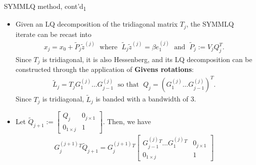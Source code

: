 \documentclass[t,usepdftitle=false]{beamer}
\begin{document}
\begin{frame}{SYMMLQ method, cont'd\textsubscript{1}}
\begin{itemize}
\item Given an LQ decomposition of the tridiagonal matrix $T_j$, the SYMMLQ iterate can be recast into
\begin{align*}
x_j=x_0+\tilde{P}_j\tilde{z}^{(j)}
\;\text{ where }\;
\tilde{L}_j\tilde{z}^{(j)}=\beta e_1^{(j)}
\;\text{ and }\;
\tilde{P}_j:=V_jQ_j^T.
\end{align*}
Since $T_j$ is tridiagonal, it is also Hessenberg, and its LQ decomposition can be constructed through the application of \textbf{Givens rotations}:\vspace{-.1cm}
\begin{align*}
\tilde{L}_j=T_jG_1^{(j)}\dots G_{j-1}^{(j)}
\;\text{ so that }\;Q_j=\left(G_1^{(j)}\dots G_{j-1}^{(j)}\right)^T.
\end{align*}
Since $T_j$ is tridiagonal, $\tilde{L}_j$ is banded with a bandwidth of 3.
\item[] Let $\tilde{Q}_{j+1}:=\begin{bmatrix}Q_j&0_{j\times 1}\\0_{1\times j}&1\end{bmatrix}$.
Then, we have
\begin{align*}
G_j^{(j+1)}{}^T\tilde{Q}_{j+1}=
G_j^{(j+1)}{}^T
\begin{bmatrix}
G_{j-1}^{(j)}{}^T\dots G_{1}^{(j)}{}^T&0_{j\times 1}\\
0_{1\times j}&1
\end{bmatrix}
\end{align*}
\end{itemize}
\end{frame}
\end{document}
